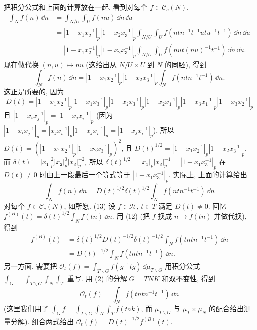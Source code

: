 \begin{solution}
\[\]
把积分公式和上面的计算放在一起, 看到对每个 $f \in \mathcal{C}_c(N)$,
\begin{align*}
\int_N f(n)\,\dd n &= \int_{N/U}\int_U f(nu)\,\dd n\,\dd u \\
&= |1 - x_1x_2^{-1}|_p|1 - x_2x_3^{-1}|_p\int_{N/U}\int_U f(ntn^{-1}t^{-1}utu^{-1}t^{-1})\,\dd n\,\dd u \\
&= |1 - x_1x_2^{-1}|_p|1 - x_2x_3^{-1}|_p\int_{N/U}\int_U f(nut(nu)^{-1}t^{-1})\,\dd n\,\dd u.
\end{align*}
现在做代换 $(n, u) \longmapsto nu$ (这给出从 $N/U \times U$ 到 $N$ 的同胚), 得到
\[
\int_N f(n)\,\dd n = |1 - x_1x_2^{-1}|_p|1 - x_2x_3^{-1}|_p\int_N f(ntn^{-1}t^{-1})\,\dd n.
\]
这正是所要的, 因为
\[
D(t) = |1 - x_1x_2^{-1}|_p|1 - x_1x_3^{-1}|_p|1 - x_2x_3^{-1}|_p|1 - x_2x_1^{-1}|_p|1 - x_3x_1^{-1}|_p|1 - x_3x_2^{-1}|_p
\]
且 $|1 - x_ix_j^{-1}|_p = |1 - x_jx_i^{-1}|_p$ (因为 $|1 - x_ix_j^{-1}|_p = |x_jx_i^{-1}|_p|1 - x_jx_i^{-1}|_p = |1 - x_jx_i^{-1}|_p$), 所以 $D(t) = (|1 - x_1x_2^{-1}|_p|1 - x_2x_3^{-1}|_p)^2$, 且 $D(t)^{1/2} = |1 - x_1x_2^{-1}|_p|1 - x_2x_3^{-1}|_p$. 而 $\delta(t) = |x_1|_p^2|x_2|_p^0|x_3|_p^{-2}$, 所以 $\delta(t)^{1/2} = |x_1|_p|x_3|_p^{-1} = |1 - x_1x_3^{-1}|_p$ 在 $D(t) \neq 0$ 时由上一段最后一个等式等于 $|1 - x_1x_3^{-1}|_p$.
实际上, 上面的计算给出
\[
\int_N f(n)\,\dd n = D(t)^{1/2}\delta(t)^{1/2}\int_N f(ntn^{-1}t^{-1})\,\dd n
\]
对每个 $f \in \mathcal{C}_c(N)$, 如所愿.
(13) 设 $f \in \mathcal{H}$, $t \in T$ 满足 $D(t) \neq 0$. 回忆 $f^{(B)}(t) = \delta(t)^{1/2}\int_N f(tn)\,\dd n$. 用 (12) (把 $f$ 换成 $n \longmapsto f(tn)$ 并做代换), 得到
\begin{align*}
f^{(B)}(t) &= \delta(t)^{1/2}D(t)^{-1/2}\delta(t)^{-1/2}\int_N f(tntn^{-1}t^{-1})\,\dd n \\
&= D(t)^{-1/2}\int_N f(tntn^{-1}t^{-1})\,\dd n.
\end{align*}
另一方面, 需要把 $\mathcal{O}_t(f) = \int_{T\backslash G}f(g^{-1}tg)\,\dd\mu_{T\backslash G}$ 用积分公式 $\int_G = \int_{T\backslash G}\int_N\int_T$ 重写. 用 (2) 的分解 $G = TNK$ 和双不变性, 得到
\[
\mathcal{O}_t(f) = \int_N f(tntn^{-1}t^{-1})\,\dd n
\]
(这里我们用了 $\int_G f = \int_{T\backslash G}\int_N\int_T f(tnk)$, 而 $\mu_{T\backslash G}$ 与 $\mu_T \times \mu_N$ 的配合给出测量分解). 组合两式给出 $\mathcal{O}_t(f) = D(t)^{-1/2}f^{(B)}(t)$.

\end{solution}
